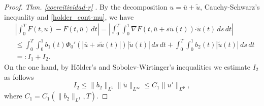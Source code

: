 \documentclass[twoside]{article}
\theoremstyle{remark}
\newcommand{\orlnor}{\|_{L^{\Phi}}}
\renewcommand{\b}[1]{\boldsymbol{#1}}
\newcommand{\ccdot}{\b{\cdot}}
\renewcommand{\leq}{\leqslant}
\begin{document}
\begin{proof} \emph{Thm. \ref{coercitividad-r} }.
By the decomposition $u=\overline{u}+\tilde{u}$,   Cauchy-Schwarz's inequality
and \eqref{holder_cont-mu}, we have
\begin{equation}\label{cota-diferencia-F}
\begin{split}
&\left|\int_0^T F(t,u)-F(t,\overline{u})\,dt\right|=
\left|\int_0^T \int_0^1 \nabla F(t,\overline{u}+s\tilde{u}(t))\ccdot \tilde{u}(t) \,ds \,dt\right|
\\
&\leq \int_0^T \int_0^1 b_1(t)\Phi_0'(|\overline{u}+s\tilde{u}(t)|)|\tilde{u}(t)|\,ds\,dt+
\int_0^T \int_0^1 b_2(t)|\tilde{u}(t)|\,ds\,dt
\\
&=:I_1+I_2.
\end{split}
\end{equation}
On the one hand, by H\"older's and Sobolev-Wirtinger's inequalities we estimate $I_2$ as follows
\begin{equation}\label{cota-i2}
I_2\leq \|b_2\|_{L^1} \|\tilde{u}\|_{L^{\infty}}\leq
C_1\|u'\orlnor,
\end{equation}
 where $C_1=C_1(\|b_2\|_{L^1}, T)$. 


\end{proof}
\end{document}
